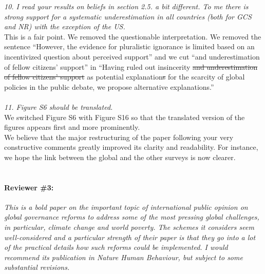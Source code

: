 \documentclass[12pt,english]{article}
\begin{document}
\textit{10. I read your results on beliefs in section 2.5. a bit different. To me there is strong support for a systematic underestimation in all countries (both for GCS and NR) with the exception of the US.}~\\

This is a fair point. We removed the questionable interpretation. We removed the sentence ``However, the evidence for pluralistic ignorance is limited based on an incentivized question about perceived support'' and we cut ``and underestimation of fellow citizens' support'' in ``Having ruled out insincerity \sout{and underestimation of fellow citizens' support} 
as potential explanation\sout{s} for the scarcity of global policies in the public debate, we propose alternative explanations.''
~\\ ~\\

\textit{11. Figure S6 should be translated.}~\\

We switched Figure S6 with Figure S16 so that the translated version of the figures appears first and more prominently.
~\\
We believe that the major restructuring of the paper following your very constructive comments greatly improved its clarity and readability. For instance, we hope the link between the global and the other surveys is now clearer.
~\\ ~\\



\clearpage
\paragraph*{Reviewer \#3:}
\textit{This is a bold paper on the important topic of international public opinion on global governance reforms to address some of the most pressing global challenges, in particular, climate change and world poverty. The schemes it considers seem well-considered and a particular strength of their paper is that they go into a lot of the practical details how such reforms could be implemented. I would recommend its publication in Nature Human Behaviour, but subject to some substantial revisions.}

~\\ ~\\
\end{document}
